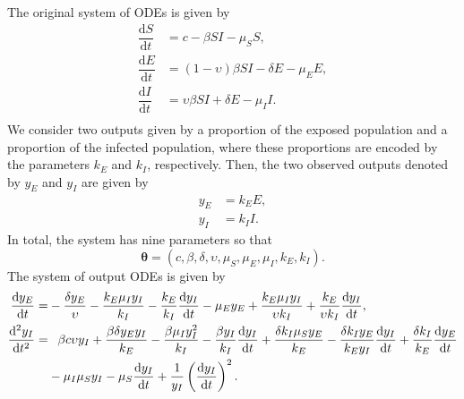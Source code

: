 \documentclass[12pt]{article}
\begin{document}
The original system of ODEs is given by
\begin{equation}
    \begin{split}
\dfrac{\mathrm{d}S}{\mathrm{d}t}&=c-\beta SI-\mu_{S}S,\\
\dfrac{\mathrm{d}E}{\mathrm{d}t}&=(1-\upsilon)\beta SI-\delta E-\mu_{E}E,\\
\dfrac{\mathrm{d}I}{\mathrm{d}t}&=\upsilon\beta SI+\delta E-\mu_{I}I.\\
\end{split}
    \label{eq:SEI}
\end{equation}
We consider two outputs given by a proportion of the exposed population and a proportion of the infected population, where these proportions are encoded by the parameters $k_{E}$ and $k_{I}$, respectively. Then, the two observed outputs denoted by $y_{E}$ and $y_{I}$ are given by
\begin{align}
    y_{E}&=k_{E}E,\label{eq:output_E}\\
    y_{I}&=k_{I}I.\label{eq:output_I}
\end{align}
In total, the system has nine parameters so that
\begin{equation}
\boldsymbol{\theta}=(c,\beta,\delta,\upsilon,\mu_{S},\mu_{E},\mu_{I},k_{E},k_{I}).
\label{eq:theta_SEI}
\end{equation}
The system of output ODEs is given by
\begin{align}
\dfrac{\mathrm{d}y_{E}}{\mathrm{d}t} =&-\frac{\delta y_{E}}{\upsilon} - \frac{k_{E} \mu_{I} y_{I}}{k_{I}} - \frac{k_{E}}{k_{I}}\dfrac{\mathrm{d}y_{I}}{\mathrm{d}t} - \mu_{E} y_{E} + \frac{k_{E} \mu_{I} y_{I}}{\upsilon k_{I}} + \frac{k_{E}}{\upsilon k_{I}}\dfrac{\mathrm{d}y_{I}}{\mathrm{d}t},\label{eq:ODE_y_E_2}\\  
\dfrac{\mathrm{d}^{2}y_{I}}{\mathrm{d}t^{2}} =&\textcolor{white}{-}\beta c \upsilon y_{I} + \frac{\beta \delta y_{E} y_{I}}{k_{E}} - \frac{\beta \mu_{I} y_{I}^{2}}{k_{I}} - \frac{\beta y_{I}}{k_{I}}\dfrac{\mathrm{d}y_{I}}{\mathrm{d}t} + \frac{\delta k_{I} \mu_{S} y_{E}}{k_{E}} - \frac{\delta k_{I} y_{E}}{k_{E} y_{I}}\dfrac{\mathrm{d}y_{I}}{\mathrm{d}t} + \frac{\delta k_{I}}{k_{E}}\dfrac{\mathrm{d}y_{E}}{\mathrm{d}t}\nonumber\\
&-\mu_{I} \mu_{S} y_{I} - \mu_{S} \dfrac{\mathrm{d}y_{I}}{\mathrm{d}t} + \frac{1}{y_{I}}\left(\dfrac{\mathrm{d}y_{I}}{\mathrm{d}t}\right)^{2}.\label{eq:ODE_y_I_2}
\end{align}

\end{document}
